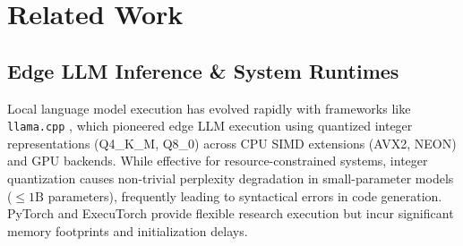 \documentclass[10pt,twocolumn]{article}
\begin{document}
\begin{table}[t]
\caption{Comprehensive Edge Inference Benchmark on Apple Silicon M2 (SmolLM2-360M-Instruct, 16\,GB Unified Memory, $n=20$ runs)}
\label{tab:comprehensive_benchmark}
\centering
{}
\end{table}

\section{Related Work}
\subsection{Edge LLM Inference \& System Runtimes}
Local language model execution has evolved rapidly with frameworks like \texttt{llama.cpp} \cite{llamacpp}, which pioneered edge LLM execution using quantized integer representations (Q4\_K\_M, Q8\_0) across CPU SIMD extensions (AVX2, NEON) and GPU backends. While effective for resource-constrained systems, integer quantization causes non-trivial perplexity degradation in small-parameter models ($\le 1\text{B}$ parameters), frequently leading to syntactical errors in code generation. PyTorch \cite{pytorch} and ExecuTorch provide flexible research execution but incur significant memory footprints and initialization delays.
\end{document}
